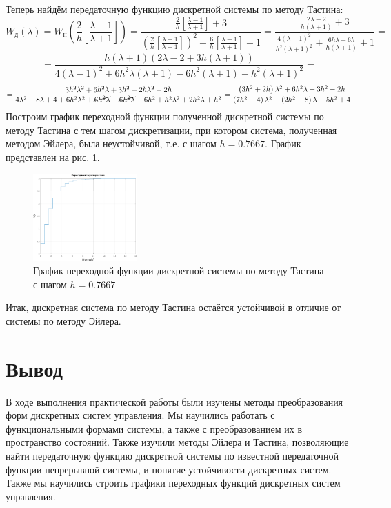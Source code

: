 \documentclass[a4paper]{article}
\newcommand{\addsection}[1]{
    \phantomsection
    \addcontentsline{toc}{section}{#1}
    \section*{\centering #1}
}
\begin{document}
Теперь найдём передаточную функцию дискретной системы по методу Тастина:
$$W_\text{д}(\lambda) = W_\text{н}\left( \frac{2}{h}\left[ \frac{\lambda - 1}{\lambda + 1} \right] \right) = \frac{\frac{2}{h}\left[ \frac{\lambda - 1}{\lambda + 1} \right] + 3}{\left( \frac{2}{h}\left[ \frac{\lambda - 1}{\lambda + 1} \right] \right)^2 + \frac{6}{h}\left[ \frac{\lambda - 1}{\lambda + 1} \right] + 1} = \frac{\frac{2\lambda - 2}{h(\lambda + 1)} + 3}{\frac{4(\lambda - 1)^2}{h^2(\lambda + 1)^2} + \frac{6h\lambda - 6h}{h(\lambda + 1)} + 1} = $$
$$ = \frac{h\left( \lambda + 1 \right)\left( 2\lambda - 2 + 3h\left( \lambda + 1 \right) \right)}{4(\lambda - 1)^2 + 6h^2\lambda(\lambda + 1) - 6h^2(\lambda + 1) + h^2(\lambda + 1)^2} =$$
$$= \frac{3 h^{2} \lambda^{2} + 6 h^{2} \lambda + 3 h^{2} + 2 h \lambda^{2} - 2 h}{4\lambda^2 - 8\lambda + 4 + 6h^2\lambda^2 + \cancel{6h^2\lambda} - \cancel{6h^2\lambda} - 6h^2 + h^2\lambda^2 + 2h^2\lambda + h^2} = \frac{\left( 3 h^{2}+2h \right)\lambda^2 + 6h^2\lambda + 3h^2 - 2h}{\left( 7h^2 + 4 \right)\lambda^2 + \left( 2h^2 - 8 \right)\lambda - 5h^2+ 4}$$
Построим график переходной функции полученной дискретной системы по методу Тастина с тем шагом дискретизации, при котором система, полученная методом Эйлера, была неустойчивой, т.е. с шагом $h = 0.7667$. График представлен на рис. \ref{fig:stepplot_tustin}.
\begin{figure}[H]
    \centering
    \includegraphics[width=0.356\textwidth]{sources/discrete_0.7667_tustin.png}
    \caption{График переходной функции дискретной системы по методу Тастина с шагом $h = 0.7667$}
    \label{fig:stepplot_tustin}
\end{figure}
Итак, дискретная система по методу Тастина остаётся устойчивой в отличие от системы по методу Эйлера.
\addsection{Вывод}
В ходе выполнения практической работы были изучены методы преобразования форм дискретных систем управления. Мы научились работать с функциональными формами системы, а также с преобразованием их в пространство состояний. Также изучили методы Эйлера и Тастина, позволяющие найти передаточную функцию дискретной системы по известной передаточной функции непрерывной системы, и понятие устойчивости дискретных систем. Также мы научились строить графики переходных функций дискретных систем управления.
\end{document}
